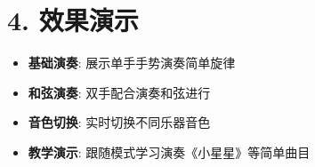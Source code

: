 \section{4. 效果演示}\label{ux6548ux679cux6f14ux793a}

\begin{itemize}
\tightlist
\item
  \textbf{基础演奏}: 展示单手手势演奏简单旋律
\item
  \textbf{和弦演奏}: 双手配合演奏和弦进行
\item
  \textbf{音色切换}: 实时切换不同乐器音色
\item
  \textbf{教学演示}: 跟随模式学习演奏《小星星》等简单曲目
\end{itemize}
